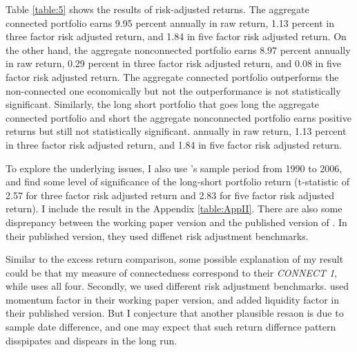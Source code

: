 \documentclass[11pt]{article}
\begin{document}
\begin{doublespace}
Table \ref{table:5} shows the results of risk-adjusted returns. The aggregate connected portfolio earns 9.95 percent annually in raw return, 1.13 percent in three factor risk adjusted return, and 1.84 in five factor risk adjusted return. On the other hand, the aggregate nonconnected portfolio earns 8.97 percent annually in raw return, 0.29 percent in three factor risk adjusted return, and 0.08 in five factor risk adjusted return. The aggregate connected portfolio outperforms the non-connected one economically but not the outperformance is not statistically significant. Similarly, the long short portfolio that goes long the aggregate connected portfolio and short the aggregate nonconnected portfolio earns positive returns but still not statistically significant. annually in raw return, 1.13 percent in three factor risk adjusted return, and 1.84 in five factor risk adjusted return. 

To explore the underlying issues, I also use \cite{cohen2008small}'s sample period from 1990 to 2006, and find some level of significance of the long-short portfolio return (t-statistic of 2.57 for three factor risk adjusted return and 2.83 for five factor risk adjusted return). I include the result in the Appendix \ref{table:AppII}. There are also some disprepancy between the working paper version and the published version of \cite{cohen2008small}. In their published version, they used diffenet risk adjustment benchmarks. 

Similar to the excess return comparison, some possible explanation of my result could be that my measure of connectedness correspond to their \emph{CONNECT 1}, while \cite{cohen2008small} uses all four. Secondly, we used different risk adjustment benchmarks. \cite{cohen2008small} used momentum factor in their working paper version, and added liquidity factor in their published version. But I conjecture that another plausible resaon is due to sample date difference, and one may expect that such return differnce pattern disspipates and dispears in the long run. 


\end{doublespace}
\end{document}
